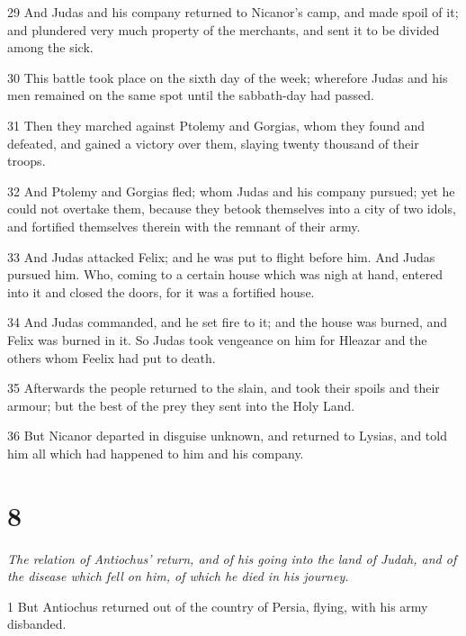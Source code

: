 \par 29 And Judas and his company returned to Nicanor’s camp, and made spoil of it; and plundered very much property of the merchants, and sent it to be divided among the sick. 

\par 30 This battle took place on the sixth day of the week; wherefore Judas and his men remained on the same spot until the sabbath-day had passed. 

\par 31 Then they marched against Ptolemy and Gorgias, whom they found and defeated, and gained a victory over them, slaying twenty thousand of their troops. 

\par 32 And Ptolemy and Gorgias fled; whom Judas and his company pursued; yet he could not overtake them, because they betook themselves into a city of two idols, and fortified themselves therein with the remnant of their army. 

\par 33 And Judas attacked Felix; and he was put to flight before him. And Judas pursued him. Who, coming to a certain house which was nigh at hand, entered into it and closed the doors, for it was a fortified house. 

\par 34 And Judas commanded, and he set fire to it; and the house was burned, and Felix was burned in it. So Judas took vengeance on him for Hleazar and the others whom Feelix had put to death. 

\par 35 Afterwards the people returned to the slain, and took their spoils and their armour; but the best of the prey they sent into the Holy Land. 

\par 36 But Nicanor departed in disguise unknown, and returned to Lysias, and told him all which had happened to him and his company. 

\chapter{8}

\par \textit{The relation of Antiochus’ return, and of his going into the land of Judah, and of the disease which fell on him, of which he died in his journey.}

\par 1 But Antiochus returned out of the country of Persia, flying, with his army disbanded. 


